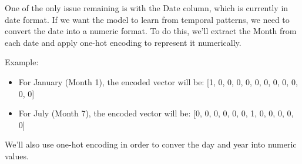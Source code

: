 \documentclass[11pt]{article}
\providecommand{\tightlist}{%
      \setlength{\itemsep}{0pt}\setlength{\parskip}{0pt}}
\begin{document}
    One of the only issue remaining is with the Date column, which is
currently in date format. If we want the model to learn from temporal
patterns, we need to convert the date into a numeric format. To do this,
we'll extract the Month from each date and apply one-hot encoding to
represent it numerically.

Example:

\begin{itemize}
\tightlist
\item
  For January (Month 1), the encoded vector will be: {[}1, 0, 0, 0, 0,
  0, 0, 0, 0, 0, 0, 0{]}
\item
  For July (Month 7), the encoded vector will be: {[}0, 0, 0, 0, 0, 0,
  1, 0, 0, 0, 0, 0{]}
\end{itemize}

We'll also use one-hot encoding in order to conver the day and year into
numeric values.
\end{document}

